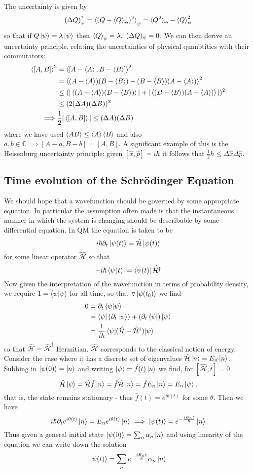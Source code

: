 \documentclass{article}
\begin{document}
The uncertainty is given by
$$
  (\Delta Q)_\psi^2=\braket{(Q-\braket{Q}_\psi)^2}_\psi=\braket{Q^2}_\psi-\braket{Q}_\psi^2
$$
so that if $Q\ket{\psi}=\lambda\ket{\psi}$ then $\braket{Q}_\psi=\lambda,~(\Delta Q)_\psi=0$.  We can then derive an uncertainty principle, relating the uncertainties of physical quanbtities with their commutators:
\begin{align*}
  \braket{[A,B]}^2&=\braket{[A-\braket{A},B-\braket{B}]}^2
  \\
  &=\braket{(A-\braket{A})(B-\braket{B})-(B-\braket{B})(A-\braket{A})}^2
  \\
  &\leq(|\braket{(A-\braket{A})(B-\braket{B})}|+|\braket{(B-\braket{B})(A-\braket{A})}|)^2
  \\
  &\leq(2(\Delta A)(\Delta B))^2
  \\
  \implies& \frac{1}{2}|\braket{[A,B]}|\leq(\Delta A)(\Delta B)
\end{align*}
where we have used $\braket{AB}\leq\braket{A}\braket{B}$ and also $a,b\in\mathbb{C}\implies[A-a,B-b]=[A,B]$.  A significant example of this is the Heisenburg uncertainty principle: given $[\hat{x},\hat{p}]=i\hbar$ it follows that $\frac{1}{2}\hbar\leq\Delta\hat{x}\Delta\hat{p}$.
\subsection{Time evolution of the Schr\"odinger Equation}
We should hope that a wavefunction should be governed by some appropriate equation.  In particular the assumption often made is that the instantaneous manner in which the system is changing should be describable by some differential equation.  In QM the equation is taken to be
$$
  i\hbar\partial_t\ket{\psi(t)}=\hat{\mathcal{H}}\ket{\psi(t)}
$$
for some linear operator $\hat{\mathcal H}$ so that
$$
  -i\hbar\bra{\psi(t)}=\bra{\psi(t)}\hat{\mathcal{H}^\dagger}
$$
Now given the interpretation of the wavefunction in terms of probability density, we require $1=\braket{\psi|\psi}$ for all time, so that $\forall\ket{\psi(t_0)}$ we find
\begin{align*}
  0&=\partial_t\braket{\psi|\psi}
  \\
  &=\bra{\psi}(\partial_t\ket{\psi})+(\partial_t\bra{\psi})\ket{\psi}
  \\
  &=\frac{1}{i\hbar}\braket{\psi|(\hat{\mathcal{H}}-\hat{\mathcal{H}}^\dagger)|\psi}
\end{align*}
so that $\hat{\mathcal{H}}=\hat{\mathcal{H}}^\dagger$ Hermitian.  $\hat{\mathcal{H}}$ corresponds to the classical notion of energy.  Consider the case where it has a discrete set of eigenvalues $\hat{\mathcal{H}}\ket{n}=E_n\ket{n}$.  Subbing in $\ket{\psi(0)}=\ket{n}$ and writing $\ket\psi=\hat f(t)\ket n$ we find, for $[\hat{\mathcal{H}},t]=0$,
$$
  \hat{\mathcal H}\ket\psi=\hat{\mathcal H}\hat f\ket n=\hat f\hat{\mathcal H}\ket n=\hat fE_n\ket n=E_n\ket\psi,
$$
that is, the state remains stationary - thus $\hat f(t)=e^{i\theta(t)}$ for some $\theta$.  Then we have
$$
  i\hbar\partial_te^{i\theta(t)}\ket n=E_ne^{i\theta(t)}\ket n\implies \ket{\psi(t)}=e^{-\frac{iE_nt}{\hbar}}\ket n
$$
Thus given a general initial state $\ket{\psi(0)}=\sum_n\alpha_n\ket n$ and using linearity of the equation we can write down the solution
$$
  \ket{\psi(t)}=\sum_ne^{-\frac{iE_nt}{\hbar}}\alpha_n\ket n
$$
\end{document}
